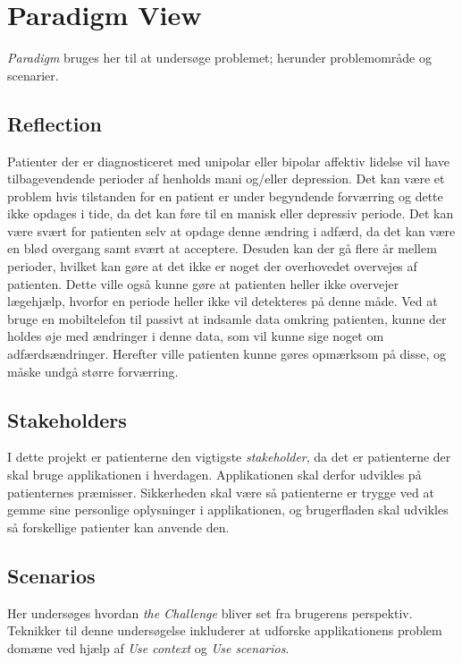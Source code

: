 

\section{Paradigm View}
\textit{Paradigm} bruges her til at undersøge problemet; herunder problemområde og scenarier.

\subsection{Reflection}
Patienter der er diagnosticeret med unipolar eller bipolar affektiv lidelse vil have tilbagevendende perioder af henholds mani og/eller depression.
Det kan være et problem hvis tilstanden for en patient er under begyndende forværring og dette ikke opdages i tide, da det kan føre til en manisk eller depressiv periode.
Det kan være svært for patienten selv at opdage denne ændring i adfærd, da det kan være en blød overgang samt svært at acceptere.
Desuden kan der gå flere år mellem perioder, hvilket kan gøre at det ikke er noget der overhovedet overvejes af patienten.
Dette ville også kunne gøre at patienten heller ikke overvejer lægehjælp, hvorfor en periode heller ikke vil detekteres på denne måde.
Ved at bruge en mobiltelefon til passivt at indsamle data omkring patienten, kunne der holdes øje med ændringer i denne data, som vil kunne sige noget om adfærdsændringer.
Herefter ville patienten kunne gøres opmærksom på disse, og måske undgå større forværring.

\subsection{Stakeholders}
I dette projekt er patienterne den vigtigste \textit{stakeholder}, da det er patienterne der skal bruge applikationen i hverdagen.
Applikationen skal derfor udvikles på patienternes præmisser.
Sikkerheden skal være så patienterne er trygge ved at gemme sine personlige oplysninger i applikationen, og brugerfladen skal udvikles så forskellige patienter kan anvende den.

\subsection{Scenarios}
Her undersøges hvordan \textit{the Challenge} bliver set fra brugerens perspektiv.
Teknikker til denne undersøgelse inkluderer at udforske applikationens problem domæne ved hjælp af \textit{Use context} og \textit{Use scenarios}.

